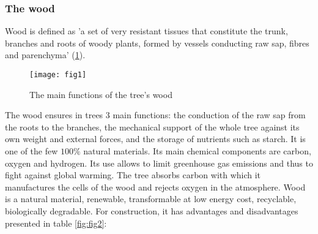 \subsubsection{The wood}

Wood is defined as 'a set of very resistant tissues that constitute the trunk, branches and roots of woody plants, formed by vessels conducting raw sap, fibres and parenchyma' (\ref{fig:fig1}). 


\begin{figure}[htp]
	\centering
	\texttt{[image: fig1]}
	\caption{The main functions of the tree's wood \cite{B.Thibaut}}
	\label{fig:fig1}
\end{figure}

The wood ensures in trees 3 main functions: the conduction of the raw sap from the roots to the branches, the mechanical support of the whole tree against its own weight and external forces, and the storage of nutrients such as starch. It is one of the few $100 \%$ natural materials. Its main chemical components are carbon, oxygen and hydrogen. Its use allows to limit greenhouse gas emissions and thus to fight against global warming. The tree absorbs carbon with which it manufactures the cells of the wood and rejects oxygen in the atmosphere. Wood is a natural material, renewable, transformable at low energy cost, recyclable, biologically degradable. For construction, it has advantages and disadvantages presented in table \ref{fig:fig2}:

\begin{comment}
\begin{table} \centering
	\begin{tabular}{cc}
		\toprule %
		 The advantages and disadvantages of wood  \\\midrule
		The advantages & The disavantages \\\midrule
		Solidity and lightness: the strength-to-weight ratio is high. Its low density (500kg/m3) allows the use of less massive foundations.& Natural material and therefore has a high variability \\\midrule  
		Good thermal insulation: it is much less conductive than steel or concrete and reduces thermal bridges in buildings. & Orthotropic material \\\midrule
		Renewable and aesthetic. & Moisture-sensitive material \\\midrule
		Chemically inert. & Material sensitive to attack by insects and fungi \\\midrule
		Good fire behaviour: there is no toxic release, little heat transmission to neighbouring parts. Wood has a higher load-bearing capacity than steel. & Material that requires regular maintenance. \\ 
		\bottomrule %
	\end{tabular}
	\caption{Orders of magnitude of axial compressive strengths and elastic moduli}
	\label{fig:fig13}
\end{table}
\end{comment}

